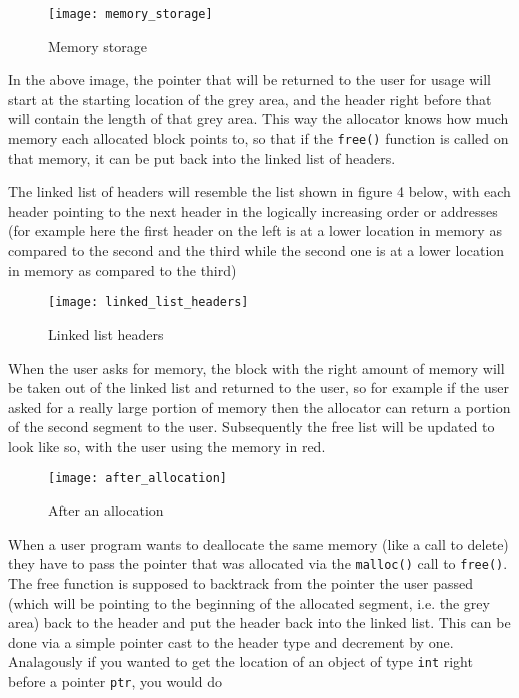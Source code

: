 \documentclass{article}
\begin{document}
\begin{figure}[!htb]
\centering
\texttt{[image: memory\_storage]}
\caption{Memory storage}
\end{figure}

In the above image, the pointer that will be returned to the user for usage
will start at the starting location of the grey area, and the header right
before that will contain the length of that grey area.  This way the allocator
knows how much memory each allocated block points to, so that if the
\texttt{free()} function is called on that memory, it can be put back into the
linked list of headers.

The linked list of headers will resemble the list shown in figure 4 below,
with each header pointing to the next header in the logically increasing order
or addresses (for example here the first header on the left is at a lower
location in memory as compared to the second and the third while the second
one is at a lower location in memory as compared to the third)

\begin{figure}[!htb]
\centering
\texttt{[image: linked\_list\_headers]}
\caption{Linked list headers}
\end{figure}

When the user asks for memory, the block with the right amount of memory will
be taken out of the linked list and returned to the user, so for example if
the user asked for a really large portion of memory then the allocator can
return a portion of the second segment to the user.  Subsequently the free
list will be updated to look like so, with the user using the memory in red.

\begin{figure}[!htb]
\centering
\texttt{[image: after\_allocation]}
\caption{After an allocation}
\end{figure}

When a user program wants to deallocate the same memory (like a call to
delete) they have to pass the pointer that was allocated via the
\texttt{malloc()} call to \texttt{free()}.  The free function is supposed to
backtrack from the pointer the user passed (which will be pointing to the
beginning of the allocated segment, i.e.  the grey area) back to the header
and put the header back into the linked list.  This can be done via a simple
pointer cast to the header type and decrement by one.  Analagously if you
wanted to get the location of an object of type \texttt{int} right before a
pointer \texttt{ptr}, you would do
\end{document}
